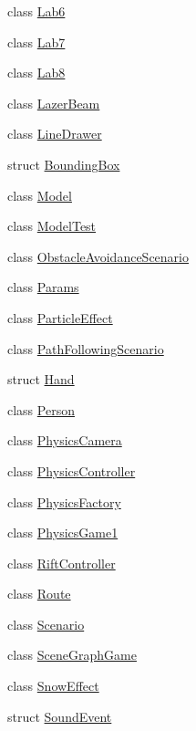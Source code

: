 \begin{DoxyCompactItemize}
\item 
class \hyperlink{class_b_g_e_1_1_lab6}{Lab6}
\item 
class \hyperlink{class_b_g_e_1_1_lab7}{Lab7}
\item 
class \hyperlink{class_b_g_e_1_1_lab8}{Lab8}
\item 
class \hyperlink{class_b_g_e_1_1_lazer_beam}{Lazer\-Beam}
\item 
class \hyperlink{class_b_g_e_1_1_line_drawer}{Line\-Drawer}
\item 
struct \hyperlink{struct_b_g_e_1_1_bounding_box}{Bounding\-Box}
\item 
class \hyperlink{class_b_g_e_1_1_model}{Model}
\item 
class \hyperlink{class_b_g_e_1_1_model_test}{Model\-Test}
\item 
class \hyperlink{class_b_g_e_1_1_obstacle_avoidance_scenario}{Obstacle\-Avoidance\-Scenario}
\item 
class \hyperlink{class_b_g_e_1_1_params}{Params}
\item 
class \hyperlink{class_b_g_e_1_1_particle_effect}{Particle\-Effect}
\item 
class \hyperlink{class_b_g_e_1_1_path_following_scenario}{Path\-Following\-Scenario}
\item 
struct \hyperlink{struct_b_g_e_1_1_hand}{Hand}
\item 
class \hyperlink{class_b_g_e_1_1_person}{Person}
\item 
class \hyperlink{class_b_g_e_1_1_physics_camera}{Physics\-Camera}
\item 
class \hyperlink{class_b_g_e_1_1_physics_controller}{Physics\-Controller}
\item 
class \hyperlink{class_b_g_e_1_1_physics_factory}{Physics\-Factory}
\item 
class \hyperlink{class_b_g_e_1_1_physics_game1}{Physics\-Game1}
\item 
class \hyperlink{class_b_g_e_1_1_rift_controller}{Rift\-Controller}
\item 
class \hyperlink{class_b_g_e_1_1_route}{Route}
\item 
class \hyperlink{class_b_g_e_1_1_scenario}{Scenario}
\item 
class \hyperlink{class_b_g_e_1_1_scene_graph_game}{Scene\-Graph\-Game}
\item 
class \hyperlink{class_b_g_e_1_1_snow_effect}{Snow\-Effect}
\item 
struct \hyperlink{struct_b_g_e_1_1_sound_event}{Sound\-Event}
\item 

\end{DoxyCompactItemize}
